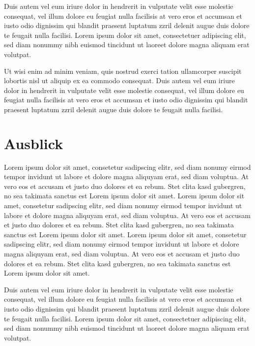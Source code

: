 \documentclass[9pt,a4paper,ngerman]{extarticle}
\begin{document}
Duis autem vel eum iriure dolor in hendrerit in vulputate velit esse molestie consequat, vel illum dolore eu feugiat nulla facilisis at vero eros et accumsan et iusto odio dignissim qui blandit praesent luptatum zzril delenit augue duis dolore te feugait nulla facilisi. Lorem ipsum dolor sit amet, consectetuer adipiscing elit, sed diam nonummy nibh euismod tincidunt ut laoreet dolore magna aliquam erat volutpat.   

Ut wisi enim ad minim veniam, quis nostrud exerci tation ullamcorper suscipit lobortis nisl ut aliquip ex ea commodo consequat. Duis autem vel eum iriure dolor in hendrerit in vulputate velit esse molestie consequat, vel illum dolore eu feugiat nulla facilisis at vero eros et accumsan et iusto odio dignissim qui blandit praesent luptatum zzril delenit augue duis dolore te feugait nulla facilisi. 

\clearpage

\part{Ausblick}\label{sec:zusammenfassung}

Lorem ipsum dolor sit amet, consetetur sadipscing elitr, sed diam nonumy eirmod tempor invidunt ut labore et dolore magna aliquyam erat, sed diam voluptua. At vero eos et accusam et justo duo dolores et ea rebum. Stet clita kasd gubergren, no sea takimata sanctus est Lorem ipsum dolor sit amet. Lorem ipsum dolor sit amet, consetetur sadipscing elitr, sed diam nonumy eirmod tempor invidunt ut labore et dolore magna aliquyam erat, sed diam voluptua. At vero eos et accusam et justo duo dolores et ea rebum. Stet clita kasd gubergren, no sea takimata sanctus est Lorem ipsum dolor sit amet. Lorem ipsum dolor sit amet, consetetur sadipscing elitr, sed diam nonumy eirmod tempor invidunt ut labore et dolore magna aliquyam erat, sed diam voluptua. At vero eos et accusam et justo duo dolores et ea rebum. Stet clita kasd gubergren, no sea takimata sanctus est Lorem ipsum dolor sit amet.   

Duis autem vel eum iriure dolor in hendrerit in vulputate velit esse molestie consequat, vel illum dolore eu feugiat nulla facilisis at vero eros et accumsan et iusto odio dignissim qui blandit praesent luptatum zzril delenit augue duis dolore te feugait nulla facilisi. Lorem ipsum dolor sit amet, consectetuer adipiscing elit, sed diam nonummy nibh euismod tincidunt ut laoreet dolore magna aliquam erat volutpat.   
\end{document}
